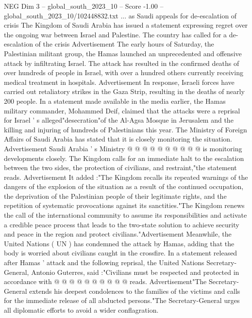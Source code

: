\begin{textsample}{NEG Dim 3 – global\_south\_2023\_10 – Score -1.00 – global\_south\_2023\_10/102448832.txt}  \label{ex:f3_neg_027}
... as Saudi appeals for de-escalation of crisis The Kingdom of Saudi Arabia has issued a statement expressing regret over the ongoing war between Israel and Palestine.
The country has called for a de-escalation of the crisis Advertisement The early hours of Saturday, the Palestinian militant group, the Hamas launched an unprecedented and offensive attack by infiltrating Israel.
The attack has resulted in the confirmed deaths of over hundreds of people in Israel, with over a hundred others currently receiving medical treatment in hospitals.
Advertisement In response, Israeli forces have carried out retaliatory strikes in the Gaza Strip, resulting in the deaths of nearly 200 people.
In a statement made available in the media earlier, the Hamas military commander, Mohammed Deif, claimed that the attacks were a reprisal for Israel ' s alleged"desecration"of the Al-Agsa Mosque in Jerusalem and the killing and injuring of hundreds of Palestinians this year.
The Ministry of Foreign Affairs of Saudi Arabia has stated that it is closely monitoring the situation.
Advertisement Saudi Arabia ' s Ministry @ @ @ @ @ @ @ @ @ @ is monitoring developments closely.
The Kingdom calls for an immediate halt to the escalation between the two sides, the protection of civilians, and restraint,"the statement reads.
Advertisement It added :"The Kingdom recalls its repeated warnings of the dangers of the explosion of the situation as a result of the continued occupation, the deprivation of the Palestinian people of their legitimate rights, and the repetition of systematic provocations against its sanctities."The Kingdom renews the call of the international community to assume its responsibilities and activate a credible peace process that leads to the two-state solution to achieve security and peace in the region and protect civilians."Advertisement Meanwhile, the United Nations ( UN ) has condemned the attack by Hamas, adding that the body is worried about civilians caught in the crossfire.
In a statement released after Hamas ' attack and the following reprisal, the United Nations Secretary-General, Antonio Guterres, said :"Civilians must be respected and protected in accordance with @ @ @ @ @ @ @ @ @ @ reads.
Advertisement"The Secretary-General extends his deepest condolences to the families of the victims and calls for the immediate release of all abducted persons."The Secretary-General urges all diplomatic efforts to avoid a wider conflagration.

\end{textsample}
